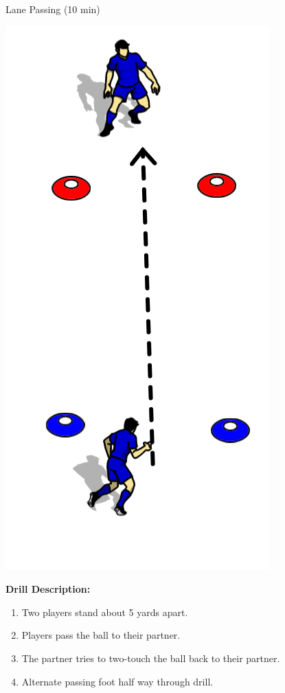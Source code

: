 \begin{oddBlock}{Lane Passing (10 min)}

\begin{minipage}[t]{\linewidth}
    \centering
    
    \begin{minipage}{.3\linewidth} %
        \centering
        \includegraphics[width=.5\textwidth]{../img/Trimmed/Lane_Pass_BW}
    \end{minipage}
    \hspace{0.05\linewidth}
    \begin{minipage}{.6\linewidth} %
        \textbf{Drill Description:}

        \begin{enumerate}
        \setlength{\itemsep}{0pt}
        \setlength{\parskip}{0pt}
        \setlength{\parsep}{0pt}
        \item Two players stand about 5 yards apart.
        \item Players pass the ball to their partner.
        \item The partner tries to two-touch the ball back to their partner.
        \item Alternate passing foot half way through drill.
        \end{enumerate}


\end{minipage}
\end{minipage}
\end{oddBlock}
